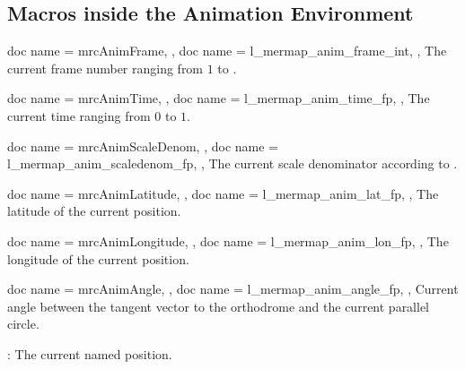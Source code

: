 \clearpage
\subsection{Macros inside the Animation Environment}\label{ref:animMacros}

\begin{docCommands}[
    doc new     = 2024-07-31,
  ]{
    {
      doc name        = mrcAnimFrame,
    },
    {
      doc name        = l_mermap_anim_frame_int,
    },
  }
  The current frame number ranging from $1$ to .
\end{docCommands}


\begin{docCommands}[
    doc new     = 2024-07-31,
  ]{
    {
      doc name        = mrcAnimTime,
    },
    {
      doc name        = l_mermap_anim_time_fp,
    },
  }
  The current time ranging from $0$ to $1$.
\end{docCommands}


\begin{docCommands}[
    doc new     = 2024-07-31,
  ]{
    {
      doc name        = mrcAnimScaleDenom,
    },
    {
      doc name        = l_mermap_anim_scaledenom_fp,
    },
  }
  The current scale denominator according to .
\end{docCommands}


\begin{docCommands}[
    doc new     = 2024-07-31,
  ]{
    {
      doc name        = mrcAnimLatitude,
    },
    {
      doc name        = l_mermap_anim_lat_fp,
    },
  }
  The latitude of the current position.
\end{docCommands}


\begin{docCommands}[
    doc new     = 2024-07-31,
  ]{
    {
      doc name        = mrcAnimLongitude,
    },
    {
      doc name        = l_mermap_anim_lon_fp,
    },
  }
  The longitude of the current position.
\end{docCommands}


\begin{docCommands}[
    doc new     = 2024-08-05,
  ]{
    {
      doc name        = mrcAnimAngle,
    },
    {
      doc name        = l_mermap_anim_angle_fp,
    },
  }
  Current angle between the tangent vector to the orthodrome and
  the current parallel circle.
\end{docCommands}




:
  The current named position.





